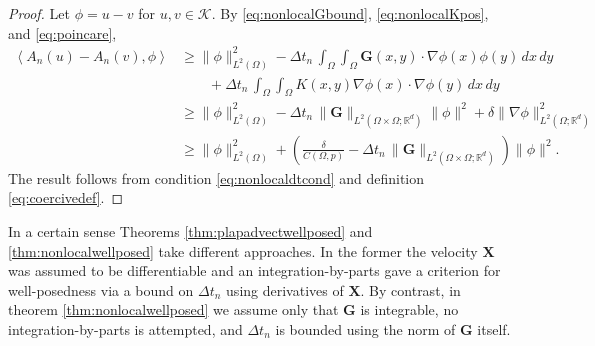 \documentclass[final,onefignum]{siamart190516}
\newcommand\bG{\mathbf{G}}
\newcommand\bX{\mathbf{X}}
\newcommand{\grad}{\nabla}
\newcommand{\ip}[2]{\ensuremath{\left<#1,#2\right>}}
\newcommand\RR{\mathbb{R}}
\begin{document}
\begin{proof}  Let $\phi=u-v$ for $u,v\in\mathcal{K}$.  By \eqref{eq:nonlocalGbound}, \eqref{eq:nonlocalKpos}, and \eqref{eq:poincare},
\begin{align*}
\ip{A_n(u)-A_n(v)}{\phi} &\ge \|\phi\|_{L^2(\Omega)}^2 - \Delta t_n\,\int_\Omega \int_\Omega \bG(x,y) \cdot \grad \phi(x) \phi(y)\,dx\,dy \\
    &\qquad + \Delta t_n\,\int_\Omega \int_\Omega K(x,y) \grad \phi(x) \cdot \grad \phi(y)\,dx\,dy \\
    &\ge \|\phi\|_{L^2(\Omega)}^2 - \Delta t_n\,\|\bG\|_{L^2(\Omega\times\Omega;\RR^d)} \|\phi\|^2 + \delta \|\grad\phi\|_{L^2(\Omega;\RR^d)}^2 \\
    &\ge \|\phi\|_{L^2(\Omega)}^2 + \left(\frac{\delta}{C(\Omega,p)} - \Delta t_n\,\|\bG\|_{L^2(\Omega\times\Omega;\RR^d)}\right) \|\phi\|^2.
\end{align*}
The result follows from condition \eqref{eq:nonlocaldtcond} and definition \eqref{eq:coercivedef}.
\end{proof}

In a certain sense Theorems \ref{thm:plapadvectwellposed} and \ref{thm:nonlocalwellposed} take different approaches.  In the former the velocity $\bX$ was assumed to be differentiable and an integration-by-parts gave a criterion for well-posedness via a bound on $\Delta t_n$ using derivatives of $\bX$.  By contrast, in theorem \ref{thm:nonlocalwellposed} we assume only that $\bG$ is integrable, no integration-by-parts is attempted, and $\Delta t_n$ is bounded using the norm of $\bG$ itself.
\end{document}
